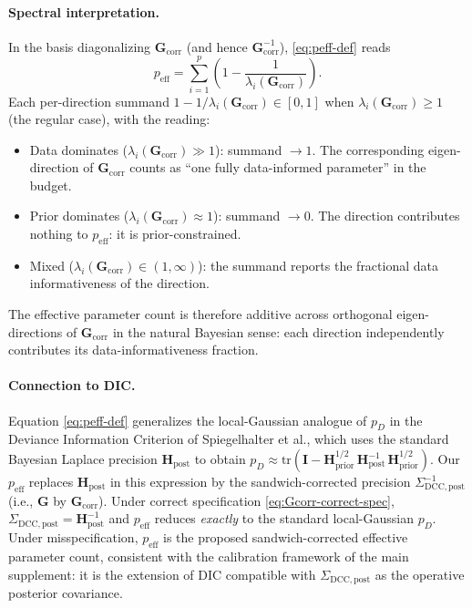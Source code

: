\documentclass[11pt]{article}
\begin{document}
\paragraph{Spectral interpretation.}
In the basis diagonalizing $\mathbf G_{\mathrm{corr}}$ (and hence $\mathbf G_{\mathrm{corr}}^{-1}$), \eqref{eq:peff-def} reads
\begin{equation}
p_{\mathrm{eff}}
=
\sum_{i=1}^{p} \left(1 - \frac{1}{\lambda_i(\mathbf G_{\mathrm{corr}})}\right).
\label{eq:peff-spectral}
\end{equation}
Each per-direction summand $1 - 1/\lambda_i(\mathbf G_{\mathrm{corr}}) \in [0,1]$ when $\lambda_i(\mathbf G_{\mathrm{corr}}) \geq 1$ (the regular case), with the reading:
\begin{itemize}
\item Data dominates ($\lambda_i(\mathbf G_{\mathrm{corr}}) \gg 1$): summand $\to 1$. The corresponding eigen-direction of $\mathbf G_{\mathrm{corr}}$ counts as ``one fully data-informed parameter'' in the budget.
\item Prior dominates ($\lambda_i(\mathbf G_{\mathrm{corr}}) \approx 1$): summand $\to 0$. The direction contributes nothing to $p_{\mathrm{eff}}$: it is prior-constrained.
\item Mixed ($\lambda_i(\mathbf G_{\mathrm{corr}}) \in (1,\infty)$): the summand reports the fractional data informativeness of the direction.
\end{itemize}
The effective parameter count is therefore additive across orthogonal eigen-directions of $\mathbf G_{\mathrm{corr}}$ in the natural Bayesian sense: each direction independently contributes its data-informativeness fraction.

\paragraph{Connection to DIC.}
Equation \eqref{eq:peff-def} generalizes the local-Gaussian analogue of $p_D$ in the Deviance Information Criterion of Spiegelhalter et al., which uses the standard Bayesian Laplace precision $\mathbf H_{\mathrm{post}}$ to obtain $p_D \approx \mathrm{tr}(\mathbf I - \mathbf H_{\mathrm{prior}}^{1/2}\, \mathbf H_{\mathrm{post}}^{-1}\, \mathbf H_{\mathrm{prior}}^{1/2})$. Our $p_{\mathrm{eff}}$ replaces $\mathbf H_{\mathrm{post}}$ in this expression by the sandwich-corrected precision $\Sigma_{\mathrm{DCC},\mathrm{post}}^{-1}$ (i.e., $\mathbf G$ by $\mathbf G_{\mathrm{corr}}$). Under correct specification \eqref{eq:Gcorr-correct-spec}, $\Sigma_{\mathrm{DCC},\mathrm{post}} = \mathbf H_{\mathrm{post}}^{-1}$ and $p_{\mathrm{eff}}$ reduces \emph{exactly} to the standard local-Gaussian $p_D$. Under misspecification, $p_{\mathrm{eff}}$ is the proposed sandwich-corrected effective parameter count, consistent with the calibration framework of the main supplement: it is the extension of DIC compatible with $\Sigma_{\mathrm{DCC},\mathrm{post}}$ as the operative posterior covariance.
\end{document}
